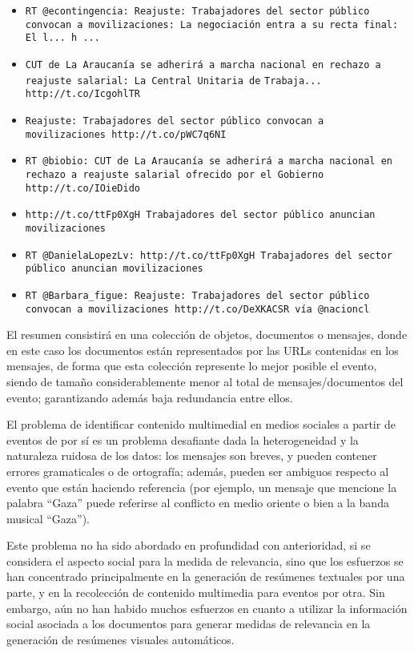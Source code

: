 \begin{itemize}
\item \texttt{RT @econtingencia: Reajuste: Trabajadores del sector público}
    \texttt{convocan a movilizaciones: La negociación entra a su recta final:}
    \texttt{El l... h ...}
\item \texttt{CUT de La Araucanía se adherirá a marcha nacional en rechazo a}
    \texttt{reajuste salarial: La Central Unitaria de}
    \texttt{Trabaja... http://t.co/IcgohlTR}
\item \texttt{Reajuste: Trabajadores del sector público convocan a}\\
    \texttt{movilizaciones http://t.co/pWC7q6NI}
\item \texttt{RT @biobio: CUT de La Araucanía se adherirá a marcha nacional en}
    \texttt{rechazo a reajuste salarial ofrecido por el Gobierno}
    \texttt{http://t.co/IOieDido}
\item \texttt{http://t.co/ttFp0XgH Trabajadores del sector público anuncian}
    \texttt{movilizaciones}
\item \texttt{RT @DanielaLopezLv: http://t.co/ttFp0XgH Trabajadores del sector}
    \texttt{público anuncian movilizaciones}
\item \texttt{RT @Barbara\_figue: Reajuste: Trabajadores del sector público}
    \texttt{convocan a movilizaciones http://t.co/DeXKACSR vía @nacioncl}
\end{itemize}

  El resumen consistirá en una colección de objetos, documentos o
  mensajes, donde en este caso los documentos están representados por
  las URLs contenidas en los mensajes, de forma que esta colección
  represente lo mejor posible el evento, siendo de tamaño
  considerablemente menor al total de mensajes/documentos del evento;
  garantizando además baja redundancia entre ellos.

  El problema de identificar contenido multimedial en medios sociales
  a partir de eventos de por sí es un problema desafiante dada la
  heterogeneidad y la naturaleza ruidosa de los datos: los mensajes
  son breves, y pueden contener errores gramaticales o de ortografía;
  además, pueden ser ambiguos respecto al evento que están haciendo
  referencia (por ejemplo, un mensaje que mencione la palabra ``Gaza''
  puede referirse al conflicto en medio oriente o bien a la banda
  musical ``Gaza'').

  Este problema no ha sido abordado en profundidad con anterioridad,
  si se considera el aspecto social para la medida de relevancia,
  sino que los esfuerzos se han concentrado principalmente en la
  generación de resúmenes textuales por una parte\cite{Conrad:2005:EDC:1165485.1165513,allan2002topic,DBLP:conf:spire:Bravo-MarquezM12,Diakopoulos:2012:FAS:2208276.2208409},
  y en la recolección de contenido multimedia para eventos por
  otra\cite{Becker:2012:ICP:2124295.2124360,Liu:2011:USM:2072609.2072613,Becker:2010:LSM:1718487.1718524}. Sin embargo, aún no
  han habido muchos esfuerzos en cuanto a utilizar la información
  social asociada a los documentos para generar medidas de relevancia
  en la generación de resúmenes visuales automáticos.

